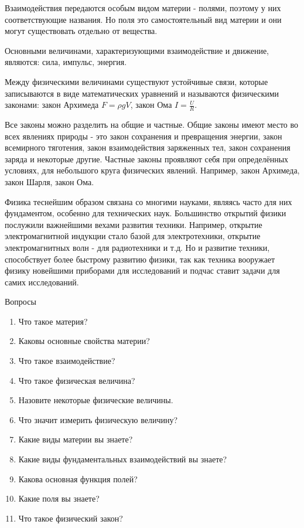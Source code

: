 \documentclass[a5paper, 10pt]{diss_4}
\renewcommand{\'}{\,'}
\begin{document}
 Взаимодействия передаются особым видом материи - полями, поэтому у них
соответствующие названия. Но поля это самостоятельный вид материи и они могут
существовать отдельно от вещества.

 Основными величинами, характеризующими взаимодействие и движение, являются:
сила, импульс, энергия.

 Между физическими величинами существуют устойчивые связи, которые
записываются в виде математических уравнений и называются физическими
законами: закон Архимеда $F=\rho gV$, закон Ома $I=\frac{U}{R}$.


  Все законы можно разделить на общие и частные. Общие законы имеют место во
всех явлениях природы - это закон сохранения и превращения энергии, закон
всемирного тяготения, закон взаимодействия заряженных тел, закон сохранения
заряда и некоторые другие. Частные законы проявляют себя при определённых
условиях, для небольшого круга физических явлений. Например, закон Архимеда,
закон Шарля, закон Ома.

  Физика теснейшим образом связана со многими науками, являясь часто для
них фундаментом, особенно для технических наук. Большинство открытий физики
послужили важнейшими вехами развития техники. Например, открытие
электромагнитной индукции стало базой для электротехники, открытие
электромагнитных волн - для радиотехники и т.д. Но и развитие техники,
способствует более быстрому развитию физики, так как техника вооружает физику
новейшими приборами для исследований и подчас ставит задачи для самих
исследований.

\begin{center}
Вопросы
\end{center}


\begin{enumerate}
  \item Что такое материя?
  \item Каковы основные свойства материи?
  \item Что такое взаимодействие?
  \item Что такое физическая величина?
  \item Назовите некоторые физические величины.
  \item Что значит измерить физическую величину?
  \item Какие виды материи вы знаете?
  \item Какие виды фундаментальных взаимодействий вы знаете?
  \item Какова основная функция полей?
  \item Какие поля вы знаете?
  \item Что такое физический закон?
\end{enumerate}
\end{document}
